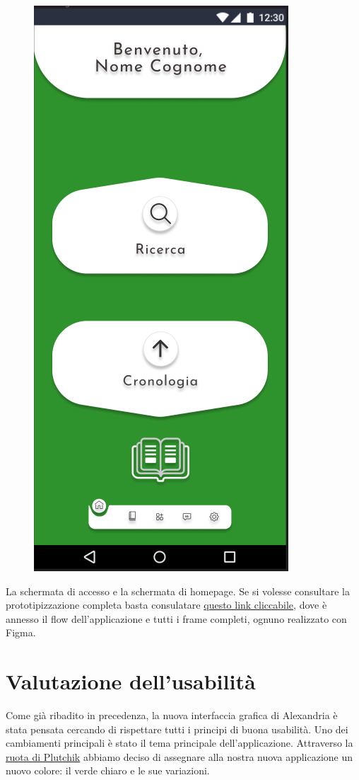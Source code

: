 \begin{figure}
\begin{minipage}{.5\textwidth}
\includegraphics[width=.60\textwidth]{Immagini/Alexandria/Screen/homepage.PNG} 

\end{minipage}
\end{figure}

La schermata di accesso e la schermata di homepage. Se si volesse consultare la prototipizzazione completa basta consulatare \href{https://www.figma.com/file/O9LZ0W5HYZAW2BCnP167fL/Alexandria?node-id=0%3A1&t=rqKqdyohunSYcSgf-1}{questo link cliccabile}, dove è annesso il flow dell'applicazione e tutti i frame completi, ognuno realizzato con Figma.


\raggedright{\section{Valutazione dell'usabilità}}
Come già ribadito in precedenza, la nuova interfaccia grafica di Alexandria è stata pensata cercando di rispettare tutti i principi di buona usabilità. Uno dei cambiamenti principali è stato il tema principale dell'applicazione. Attraverso la \href{https://www.my-personaltrainer.it/salute-benessere/la-ruota-delle-emozioni-di-plutchik-cos-e-a-cosa-serve-e-quali-sono-i-suoi-benefici.html}{ruota di Plutchik} abbiamo deciso di assegnare alla nostra nuova applicazione un nuovo colore: il verde chiaro e le sue variazioni. \\~\\

